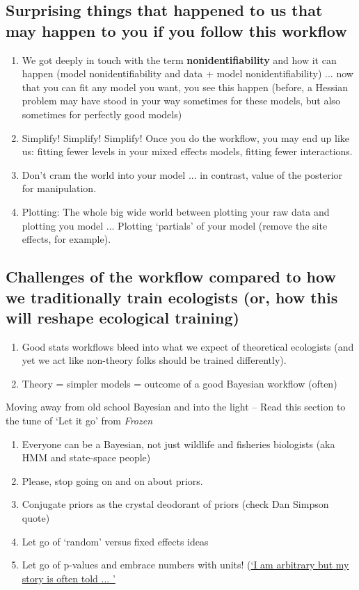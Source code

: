 \documentclass[11pt]{article}
\begin{document}
\subsection{Surprising things that happened to us that may happen to you if you follow this workflow}

\begin{enumerate}
\item We got deeply in touch with the term {\bf nonidentifiability} and how it can happen (model nonidentifiability and data + model nonidentifiability) ... now that you can fit any model you want, you see this happen (before, a Hessian problem may have stood in your way sometimes for these models, but also sometimes for perfectly good models)
\item Simplify! Simplify! Simplify! Once you do the workflow, you may end up like us: fitting fewer levels in your mixed effects models, fitting fewer interactions.
\item Don't cram the world into your model ... in contrast, value of the posterior for manipulation. 
\item Plotting: The whole big wide world between plotting your raw data and plotting you model ... Plotting `partials' of your model (remove the site effects, for example).
\end{enumerate}

\subsection{Challenges of the workflow compared to how we traditionally train ecologists (or, how this will reshape ecological training)}

\begin{enumerate}
\item Good stats workflows bleed into what we expect of theoretical ecologists (and yet we act like non-theory folks should be trained differently). 
\item Theory = simpler models = outcome of a good Bayesian workflow (often)
\end{enumerate}

Moving away from old school Bayesian and into the light -- Read this section to the tune of `Let it go' from \emph{Frozen} 
\begin{enumerate}
\item Everyone can be a Bayesian, not just wildlife and fisheries biologists (aka HMM and state-space people)
\item Please, stop going on and on about priors. 
\item Conjugate priors as the crystal deodorant of priors (check Dan Simpson quote)
\item Let go of `random' versus fixed effects ideas
\item Let go of p-values and embrace numbers with units! (\href{https://www.youtube.com/watch?v=c3hxhv0lpI0}{`I am arbitrary but my story is often told ... '}
\end{enumerate}
\end{document}
